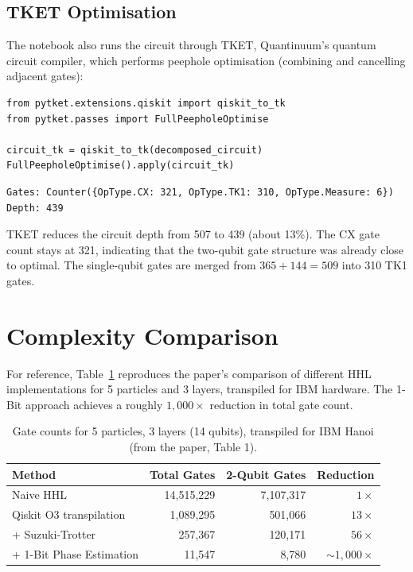 \documentclass[11pt, a4paper]{article}
\begin{document}
\subsection{TKET Optimisation}

The notebook also runs the circuit through TKET, Quantinuum's quantum
circuit compiler, which performs peephole optimisation (combining and
cancelling adjacent gates):

\begin{lstlisting}[caption={TKET optimisation}]
from pytket.extensions.qiskit import qiskit_to_tk
from pytket.passes import FullPeepholeOptimise

circuit_tk = qiskit_to_tk(decomposed_circuit)
FullPeepholeOptimise().apply(circuit_tk)
\end{lstlisting}

\begin{verbatim}
Gates: Counter({OpType.CX: 321, OpType.TK1: 310, OpType.Measure: 6})
Depth: 439
\end{verbatim}

TKET reduces the circuit depth from 507 to 439 (about 13\%). The CX gate
count stays at 321, indicating that the two-qubit gate structure was
already close to optimal. The single-qubit gates are merged from
$365 + 144 = 509$ into 310 TK1 gates.

\section{Complexity Comparison}

For reference, Table~\ref{tab:complexity} reproduces the paper's
comparison of different HHL implementations for 5 particles and 3 layers,
transpiled for IBM hardware. The 1-Bit approach achieves a roughly
$1{,}000\times$ reduction in total gate count.

\begin{table}[H]
\centering
\begin{tabular}{lrrr}
\toprule
\textbf{Method} & \textbf{Total Gates} & \textbf{2-Qubit Gates} & \textbf{Reduction} \\
\midrule
Naive HHL                & 14,515,229 & 7,107,317 & $1\times$ \\
Qiskit O3 transpilation  & 1,089,295  & 501,066   & $13\times$ \\
+ Suzuki-Trotter         & 257,367    & 120,171   & $56\times$ \\
+ 1-Bit Phase Estimation & 11,547     & 8,780     & $\sim 1{,}000\times$ \\
\bottomrule
\end{tabular}
\caption{Gate counts for 5 particles, 3 layers (14 qubits), transpiled
for IBM Hanoi (from the paper, Table 1).}
\label{tab:complexity}
\end{table}
\end{document}
